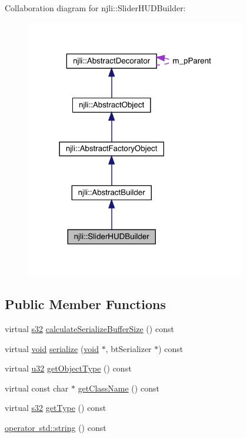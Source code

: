 Collaboration diagram for njli\+:\+:Slider\+H\+U\+D\+Builder\+:\nopagebreak
\begin{figure}[H]
\begin{center}
\leavevmode
\includegraphics[width=273pt]{classnjli_1_1_slider_h_u_d_builder__coll__graph}
\end{center}
\end{figure}
\subsection*{Public Member Functions}
\begin{DoxyCompactItemize}
\item 
virtual \mbox{\hyperlink{_util_8h_aa62c75d314a0d1f37f79c4b73b2292e2}{s32}} \mbox{\hyperlink{classnjli_1_1_slider_h_u_d_builder_a5e47f810bdbf71c626689b7abe9c98b7}{calculate\+Serialize\+Buffer\+Size}} () const
\item 
virtual \mbox{\hyperlink{_thread_8h_af1e856da2e658414cb2456cb6f7ebc66}{void}} \mbox{\hyperlink{classnjli_1_1_slider_h_u_d_builder_a35671014401438dceb5e1468c4fcff24}{serialize}} (\mbox{\hyperlink{_thread_8h_af1e856da2e658414cb2456cb6f7ebc66}{void}} $\ast$, bt\+Serializer $\ast$) const
\item 
virtual \mbox{\hyperlink{_util_8h_a10e94b422ef0c20dcdec20d31a1f5049}{u32}} \mbox{\hyperlink{classnjli_1_1_slider_h_u_d_builder_afa0f286961acc9e1657cd801b11cc360}{get\+Object\+Type}} () const
\item 
virtual const char $\ast$ \mbox{\hyperlink{classnjli_1_1_slider_h_u_d_builder_ad290f966d4e75c073125443cee217c23}{get\+Class\+Name}} () const
\item 
virtual \mbox{\hyperlink{_util_8h_aa62c75d314a0d1f37f79c4b73b2292e2}{s32}} \mbox{\hyperlink{classnjli_1_1_slider_h_u_d_builder_ae79b4051ab1041b6d0e3d6b1775fe095}{get\+Type}} () const
\item 
\mbox{\hyperlink{classnjli_1_1_slider_h_u_d_builder_ae7909be541de9b9d4662ca0e5477e430}{operator std\+::string}} () const
\end{DoxyCompactItemize}
